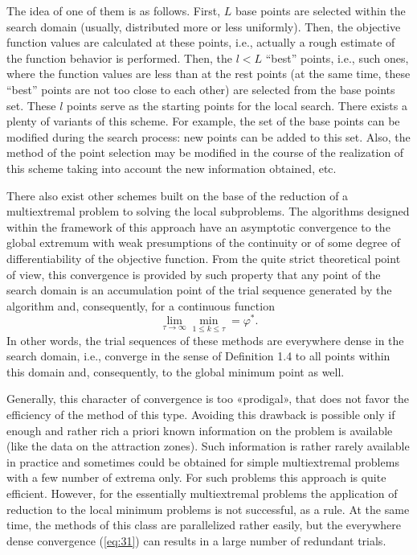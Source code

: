 The idea of one of them is as follows. First, $L$ base points are selected within the search domain (usually, distributed more or less uniformly). Then, the objective function values are calculated at these points, i.e., actually a rough estimate of the function behavior is performed. Then, the $l<L$  “best” points, i.e., such ones, where the function values are less than at the rest points (at the same time, these “best” points are not too close to each other) are selected from the base points set. These $l$ points serve as the starting points for the local search. There exists a plenty of variants of this scheme. For example, the set of the base points can be modified during the search process: new points can be added to this set. Also, the method of  the point selection may be modified in the course  of the realization of this scheme taking into account the new information obtained, etc. 

There also exist other schemes built on the base of the reduction of a multiextremal problem to solving the local subproblems. The algorithms designed within the framework of this approach have an asymptotic convergence to the global extremum with weak presumptions of the continuity or of some degree of differentiability of the objective function. From the quite strict theoretical point of view, this convergence is provided by such property that any point of the search domain is an accumulation point of the trial sequence   generated by the algorithm and, consequently, for a continuous function
\begin{equation}
\label{eq:31}
\lim_{\tau \to \infty}\min_{1\leq k \leq \tau}=\varphi^*.
\end{equation}
In other words, the trial sequences of these methods are everywhere dense in the search domain, i.e., converge in the sense of Definition 1.4 to all points within this domain and, consequently, to the global minimum point as well. 

Generally, this character of convergence is too «prodigal», that does not favor the efficiency of the method of this type. Avoiding this drawback is possible only if enough and rather rich a priori known information on the problem is available (like the data on the attraction zones). Such information is rather rarely available in practice and sometimes could be obtained for simple multiextremal problems with a few number of extrema only. For such problems this approach is quite efficient. However, for the essentially multiextremal problems the application of reduction to the local minimum problems is not successful, as a rule. At the same time, the methods of this class are parallelized rather easily, but the everywhere dense convergence (\ref{eq:31}) can results in a large number of redundant trials. 

